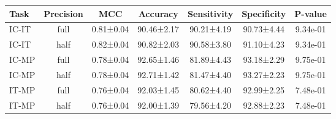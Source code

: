 \begin{tabular}{lcccccc}
\toprule
 Task & Precision &       MCC &   Accuracy & Sensitivity & Specificity &  P-value \\
\midrule
IC-IT &      full & 0.81±0.04 & 90.46±2.17 &  90.21±4.19 &  90.73±4.44 & 9.34e-01 \\
IC-IT &      half & 0.82±0.04 & 90.82±2.03 &  90.58±3.80 &  91.10±4.23 & 9.34e-01 \\
IC-MP &      full & 0.78±0.04 & 92.65±1.46 &  81.89±4.43 &  93.18±2.29 & 9.75e-01 \\
IC-MP &      half & 0.78±0.04 & 92.71±1.42 &  81.47±4.40 &  93.27±2.23 & 9.75e-01 \\
IT-MP &      full & 0.76±0.04 & 92.03±1.45 &  80.62±4.40 &  92.99±2.25 & 7.48e-01 \\
IT-MP &      half & 0.76±0.04 & 92.00±1.39 &  79.56±4.20 &  92.88±2.23 & 7.48e-01 \\
\bottomrule
\end{tabular}
